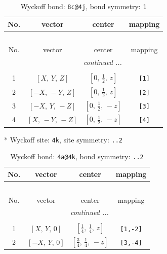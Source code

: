\documentclass[fleqn,8pt]{jsarticle}
\begin{document}
\begin{longtable}{cccc}
\caption{Wyckoff bond: {\tt 8c@4j}, bond symmetry: {\tt 1}}
 \\
 \hline \hline
No. & vector & center & mapping \\ \hline \endfirsthead

\multicolumn{3}{l}{\tablename\ \thetable{}} \\
 \hline \hline
No. & vector & center & mapping \\ \hline \endhead

 \hline \hline
\multicolumn{3}{r}{\footnotesize\it continued ...} \\ \endfoot

 \hline \hline
\multicolumn{3}{r}{} \\ \endlastfoot

1 & $\left[ X,\, Y,\, Z \right]$ & $\left[ 0,\, \frac{1}{2},\, z \right]$ & {\tt [1]} \\ \hline
2 & $\left[ - X,\, - Y,\, Z \right]$ & $\left[ 0,\, \frac{1}{2},\, z \right]$ & {\tt [2]} \\ \hline
3 & $\left[ - X,\, Y,\, - Z \right]$ & $\left[ 0,\, \frac{1}{2},\, - z \right]$ & {\tt [3]} \\ \hline
4 & $\left[ X,\, - Y,\, - Z \right]$ & $\left[ 0,\, \frac{1}{2},\, - z \right]$ & {\tt [4]} \\
\end{longtable}
* Wyckoff site: {\tt 4k}, site symmetry: {\tt ..2}
\renewcommand{\arraystretch}{1.2}
\begin{longtable}{cccc}
\caption{Wyckoff bond: {\tt 4a@4k}, bond symmetry: {\tt ..2}}
 \\
 \hline \hline
No. & vector & center & mapping \\ \hline \endfirsthead

\multicolumn{3}{l}{\tablename\ \thetable{}} \\
 \hline \hline
No. & vector & center & mapping \\ \hline \endhead

 \hline \hline
\multicolumn{3}{r}{\footnotesize\it continued ...} \\ \endfoot

 \hline \hline
\multicolumn{3}{r}{} \\ \endlastfoot

1 & $\left[ X,\, Y,\, 0 \right]$ & $\left[ \frac{1}{4},\, \frac{1}{4},\, z \right]$ & {\tt [1,-2]} \\ \hline
2 & $\left[ - X,\, Y,\, 0 \right]$ & $\left[ \frac{3}{4},\, \frac{1}{4},\, - z \right]$ & {\tt [3,-4]} \\
\end{longtable}
\end{document}
